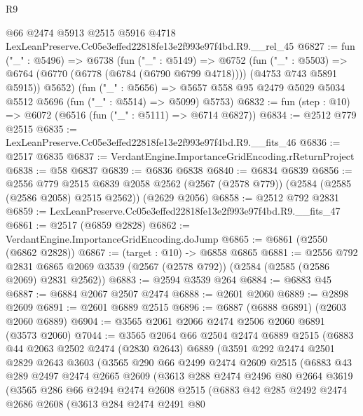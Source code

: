 \begin{lexlean}{R9}
\begin{coremodule}
    @66
    @2474
    @5913
    @2515
    @5916
    @4718
    LexLeanPreserve.Cc05e3effed22818fe13e2f993e97f4bd.R9.__rel_45
@6827 := fun ("_" : @5496) =>
  @6738
    (fun ("_" : @5149) =>
    @6752
      (fun ("_" : @5503) =>
      @6764 (@6770 (@6778 (@6784 (@6790 @6799 @4718)))) (@4753 @743 @5891 @5915))
      @5652)
    (fun ("_" : @5656) =>
    @5657 @558 @95 @2479 @5029 @5034 @5512 @5696 (fun ("_" : @5514) => @5099) @5753)
@6832 := fun (step : @10) => @6072 (@6516 (fun ("_" : @5111) => @6714 @6827))
@6834 := @2512 @779 @2515
@6835 := LexLeanPreserve.Cc05e3effed22818fe13e2f993e97f4bd.R9.__fits_46
@6836 := @2517 @6835
@6837 := VerdantEngine.ImportanceGridEncoding.rReturnProject
@6838 := @58 @6837
@6839 := @6836 @6838
@6840 := @6834 @6839
@6856 := @2556
    @779
    @2515
    @6839
    @2058
    @2562
    (@2567 (@2578 @779))
    (@2584 (@2585 (@2586 @2058) @2515 @2562))
    (@2629 @2056)
@6858 := @2512 @792 @2831
@6859 := LexLeanPreserve.Cc05e3effed22818fe13e2f993e97f4bd.R9.__fits_47
@6861 := @2517 (@6859 @2828)
@6862 := VerdantEngine.ImportanceGridEncoding.doJump
@6865 := @6861 (@2550 (@6862 @2828))
@6867 := (target : @10) -> @6858 @6865
@6881 := @2556
    @792
    @2831
    @6865
    @2069
    @3539
    (@2567 (@2578 @792))
    (@2584 (@2585 (@2586 @2069) @2831 @2562))
@6883 := @2594 @3539 @264
@6884 := @6883 @45
@6887 := @6884 @2067 @2507 @2474
@6888 := @2601 @2060
@6889 := @2898 @2609
@6891 := @2601 @6889 @2515
@6896 := @6887 (@6888 @6891) (@2603 @2060 @6889)
@6904 := @3565 @2061 @2066 @2474 @2506 @2060 @6891 (@3573 @2060)
@7044 := @3565
    @2064
    @66
    @2504
    @2474
    @6889
    @2515
    (@6883
      @44
      @2063
      @2502
      @2474
      (@2830 @2643)
      @6889
      (@3591
        @292
        @2474
        @2501
        @2829
        @2643
        @3603
        (@3565
          @290
          @66
          @2499
          @2474
          @2609
          @2515
          (@6883
            @43
            @289
            @2497
            @2474
            @2665
            @2609
            (@3613
              @288
              @2474
              @2496
              @80
              @2664
              @3619
              (@3565
                @286
                @66
                @2494
                @2474
                @2608
                @2515
                (@6883
                  @42
                  @285
                  @2492
                  @2474
                  @2686
                  @2608
                  (@3613
                    @284
                    @2474
                    @2491
                    @80

\end{coremodule}
\end{lexlean}
